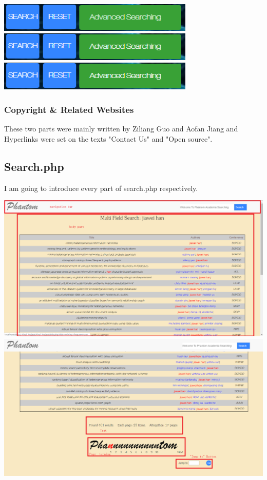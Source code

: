 \documentclass[10pt,twoside,a4paper,titlepage]{article}
\begin{document}
	\newline	
	\includegraphics[width=0.7\textwidth]{cyf/Advanced_searching29.png}
	\newline	
	\includegraphics[width=0.7\textwidth]{cyf/Advanced_searching30.png}
	\newline	
	\includegraphics[width=0.7\textwidth]{cyf/Advanced_searching31.png}
	
	\subsubsection{Copyright \& Related Websites}
	
	These two parts were mainly written by Ziliang Guo and Aofan Jiang and Hyperlinks were set on the texts "Contact Us" and "Open source".
	
	\subsection{Search.php}
	
	I am going to introduce every part of search.php respectively.
	\newline
	
	\includegraphics[width=1.0\textwidth]{cyf/SEARCH_struct1.png}
	\newline
	\includegraphics[width=1.0\textwidth]{cyf/SEARCH_2_struct2.png}
	
\end{document}
